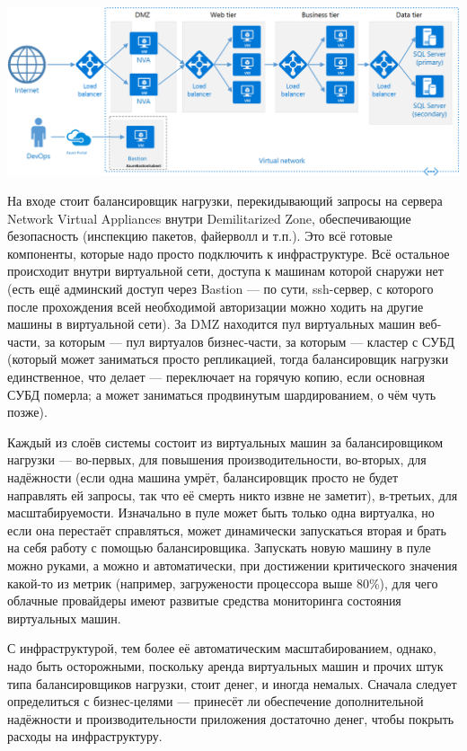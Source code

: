 \documentclass{../../text-style}
\begin{document}
\begin{center}
    \includegraphics[width=\textwidth]{n-tier-physical-bastion.png}
\end{center}

На входе стоит балансировщик нагрузки, перекидывающий запросы на сервера Network Virtual Appliances внутри Demilitarized Zone, обеспечивающие безопасность (инспекцию пакетов, файерволл и т.п.). Это всё готовые компоненты, которые надо просто подключить к инфраструктуре. Всё остальное происходит внутри виртуальной сети, доступа к машинам которой снаружи нет (есть ещё админский доступ через Bastion --- по сути, ssh-сервер, с которого после прохождения всей необходимой авторизации можно ходить на другие машины в виртуальной сети). За DMZ находится пул виртуальных машин веб-части, за которым --- пул виртуалов бизнес-части, за которым --- кластер с СУБД (который может заниматься просто репликацией, тогда балансировщик нагрузки единственное, что делает --- переключает на горячую копию, если основная СУБД померла; а может заниматься продвинутым шардированием, о чём чуть позже). 

Каждый из слоёв системы состоит из виртуальных машин за балансировщиком нагрузки --- во-первых, для повышения производительности, во-вторых, для надёжности (если одна машина умрёт, балансировщик просто не будет направлять ей запросы, так что её смерть никто извне не заметит), в-третьих, для масштабируемости. Изначально в пуле может быть только одна виртуалка, но если она перестаёт справляться, может динамически запускаться вторая и брать на себя работу с помощью балансировщика. Запускать новую машину в пуле можно руками, а можно и автоматически, при достижении критического значения какой-то из метрик (например, загружености процессора выше 80\%), для чего облачные провайдеры имеют развитые средства мониторинга состояния виртуальных машин.

С инфраструктурой, тем более её автоматическим масштабированием, однако, надо быть осторожными, поскольку аренда виртуальных машин и прочих штук типа балансировщиков нагрузки, стоит денег, и иногда немалых. Сначала следует определиться с бизнес-целями --- принесёт ли обеспечение дополнительной надёжности и производительности приложения достаточно денег, чтобы покрыть расходы на инфраструктуру.
\end{document}
